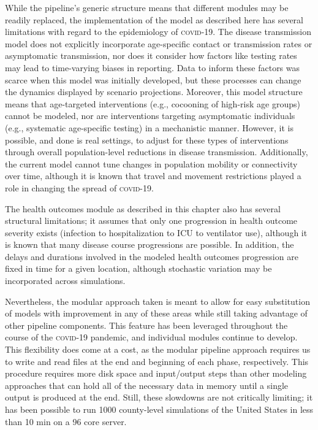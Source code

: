 While the pipeline’s generic structure means that different modules may be readily replaced, the implementation of the model as described here has several limitations with regard to the epidemiology of \textsc{covid}-19. The disease transmission model does not explicitly incorporate age-specific contact or transmission rates or asymptomatic transmission, nor does it consider how factors like testing rates may lead to time-varying biases in reporting. Data to inform these factors was scarce when this model was initially developed, but these processes can change the dynamics displayed by scenario projections. Moreover, this model structure means that age-targeted interventions  (e.g., cocooning of high-risk age groups) cannot be modeled, nor are interventions targeting asymptomatic individuals (e.g., systematic age-specific testing) in a mechanistic manner. However, it is possible, and done is real settings, to adjust for these types of interventions through overall population-level reductions in disease transmission. Additionally, the current model cannot tune changes in population mobility or connectivity over time, although it is known that travel and movement restrictions played a role in changing the spread of \textsc{covid}-19.

The health outcomes module as described in this chapter also has several structural limitations; it assumes that only one progression in health outcome severity exists (infection to hospitalization to ICU to ventilator use), although it is known that many disease course progressions are possible. In addition, the delays and durations involved in the modeled health outcomes progression are fixed in time for a given location, although stochastic variation may be incorporated across simulations.

Nevertheless, the modular approach taken is meant to allow for easy substitution of models with improvement in any of these areas while still taking advantage of other pipeline components. This feature has been leveraged throughout the course of the \textsc{covid}-19 pandemic, and individual modules continue to develop. This flexibility does come at a cost, as the modular pipeline approach requires us to write and read files at the end and beginning of each phase, respectively. This procedure requires more disk space and input/output steps than other modeling approaches that can hold all of the necessary data in memory until a single output is produced at the end. Still, these slowdowns are not critically limiting; it has been possible to run 1000 county-level simulations of the United States in less than 10 min on a 96 core server.

